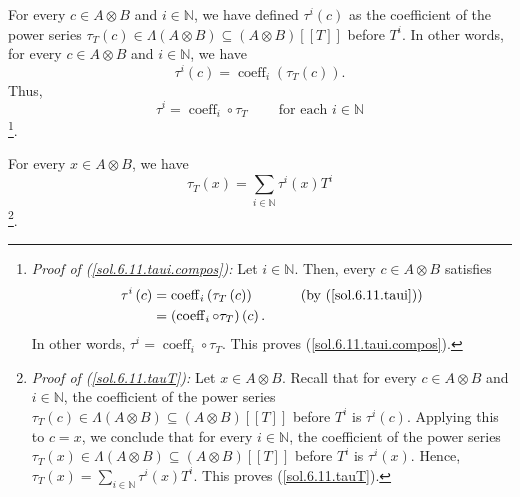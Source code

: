 \documentclass[numbers=enddot,12pt,final,onecolumn,notitlepage]{scrartcl}%
\begin{document}
For every $c\in A\otimes B$ and $i\in\mathbb{N}$, we have defined $\tau
^{i}\left(  c\right)  $ as the coefficient of the power series $\tau
_{T}\left(  c\right)  \in\Lambda\left(  A\otimes B\right)  \subseteq\left(
A\otimes B\right)  \left[  \left[  T\right]  \right]  $ before $T^{i}$. In
other words, for every $c\in A\otimes B$ and $i\in\mathbb{N}$, we have
\begin{equation}
\tau^{i}\left(  c\right)  =\operatorname*{coeff}\nolimits_{i}\left(  \tau
_{T}\left(  c\right)  \right)  . \label{sol.6.11.taui}%
\end{equation}
Thus,%
\begin{equation}
\tau^{i}=\operatorname*{coeff}\nolimits_{i}\circ\tau_{T}%
\ \ \ \ \ \ \ \ \ \ \text{for each }i\in\mathbb{N}
\label{sol.6.11.taui.compos}%
\end{equation}
\footnote{\textit{Proof of (\ref{sol.6.11.taui.compos}):} Let $i\in\mathbb{N}%
$. Then, every $c\in A\otimes B$ satisfies%
\begin{align*}
\tau^{i}\left(  c\right)   &  =\operatorname*{coeff}\nolimits_{i}\left(
\tau_{T}\left(  c\right)  \right)  \ \ \ \ \ \ \ \ \ \ \left(  \text{by
(\ref{sol.6.11.taui})}\right) \\
&  =\left(  \operatorname*{coeff}\nolimits_{i}\circ\tau_{T}\right)  \left(
c\right)  .
\end{align*}
In other words, $\tau^{i}=\operatorname*{coeff}\nolimits_{i}\circ\tau_{T}$.
This proves (\ref{sol.6.11.taui.compos}).}.

For every $x\in A\otimes B$, we have%
\begin{equation}
\tau_{T}\left(  x\right)  =\sum_{i\in\mathbb{N}}\tau^{i}\left(  x\right)
T^{i} \label{sol.6.11.tauT}%
\end{equation}
\footnote{\textit{Proof of (\ref{sol.6.11.tauT}):} Let $x\in A\otimes B$.
Recall that for every $c\in A\otimes B$ and $i\in\mathbb{N}$, the coefficient
of the power series $\tau_{T}\left(  c\right)  \in\Lambda\left(  A\otimes
B\right)  \subseteq\left(  A\otimes B\right)  \left[  \left[  T\right]
\right]  $ before $T^{i}$ is $\tau^{i}\left(  c\right)  $. Applying this to
$c=x$, we conclude that for every $i\in\mathbb{N}$, the coefficient of the
power series $\tau_{T}\left(  x\right)  \in\Lambda\left(  A\otimes B\right)
\subseteq\left(  A\otimes B\right)  \left[  \left[  T\right]  \right]  $
before $T^{i}$ is $\tau^{i}\left(  x\right)  $. Hence, $\tau_{T}\left(
x\right)  =\sum_{i\in\mathbb{N}}\tau^{i}\left(  x\right)  T^{i}$. This proves
(\ref{sol.6.11.tauT}).}.
\end{document}
